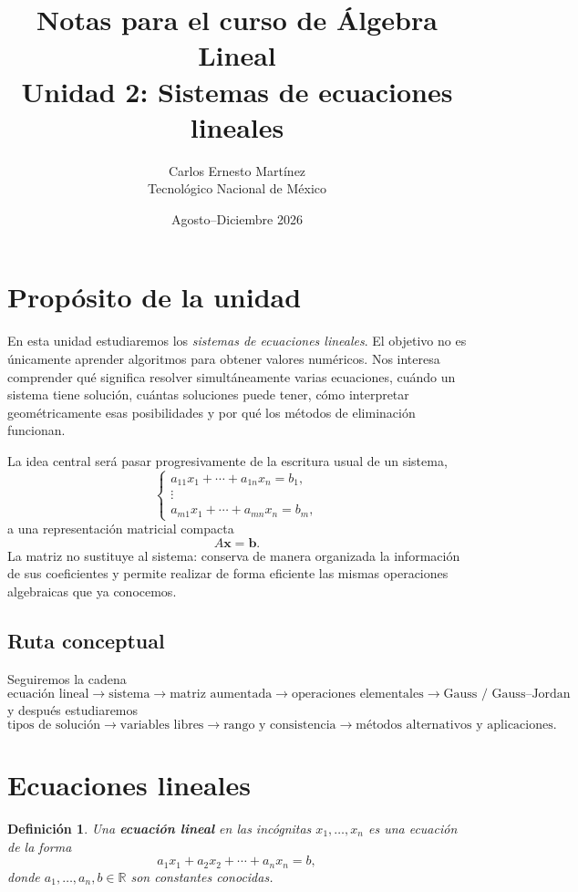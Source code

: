 \documentclass[12pt]{article}
\title{\textbf{Notas para el curso de Álgebra Lineal}\\[0.35cm]
\Large Unidad 2: Sistemas de ecuaciones lineales}
\author{Carlos Ernesto Martínez\\Tecnológico Nacional de México}
\date{Agosto--Diciembre 2026}
\newtheorem{definicion}{Definición}[section]
\theoremstyle{remark}
\newcommand{\R}{\mathbb{R}}
\begin{document}
\maketitle
\tableofcontents
\newpage

\section{Propósito de la unidad}

En esta unidad estudiaremos los \emph{sistemas de ecuaciones lineales}. El objetivo no es únicamente
aprender algoritmos para obtener valores numéricos. Nos interesa comprender qué significa resolver
simultáneamente varias ecuaciones, cuándo un sistema tiene solución, cuántas soluciones puede tener,
cómo interpretar geométricamente esas posibilidades y por qué los métodos de eliminación funcionan.

La idea central será pasar progresivamente de la escritura usual de un sistema,
\[
\begin{cases}
a_{11}x_1+\cdots+a_{1n}x_n=b_1,\\
\vdots\\
a_{m1}x_1+\cdots+a_{mn}x_n=b_m,
\end{cases}
\]
a una representación matricial compacta
\[
A\mathbf{x}=\mathbf{b}.
\]
La matriz no sustituye al sistema: conserva de manera organizada la información de sus coeficientes y permite realizar de forma eficiente las mismas operaciones algebraicas que ya conocemos.

\subsection*{Ruta conceptual}
Seguiremos la cadena
\[
\boxed{\text{ecuación lineal}}
\longrightarrow
\boxed{\text{sistema}}
\longrightarrow
\boxed{\text{matriz aumentada}}
\longrightarrow
\boxed{\text{operaciones elementales}}
\longrightarrow
\boxed{\text{Gauss / Gauss--Jordan}}
\]
y después estudiaremos
\[
\boxed{\text{tipos de solución}}
\longrightarrow
\boxed{\text{variables libres}}
\longrightarrow
\boxed{\text{rango y consistencia}}
\longrightarrow
\boxed{\text{métodos alternativos y aplicaciones}}.
\]

\section{Ecuaciones lineales}

\begin{definicion}
Una \textbf{ecuación lineal} en las incógnitas $x_1,\ldots,x_n$ es una ecuación de la forma
\[
a_1x_1+a_2x_2+\cdots+a_nx_n=b,
\]
donde $a_1,\ldots,a_n,b\in\R$ son constantes conocidas.
\end{definicion}
\end{document}
